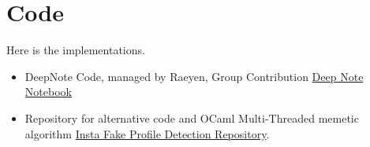 \documentclass[conference]{IEEEtran}
\begin{document}
%




\appendix

\section{Code}

Here is the implementations.

\begin{itemize}
	\item DeepNote Code, managed by Raeyen, Group Contribution \href{https://deepnote.com/workspace/yes-c049-5ed54f34-9a07-49d4-91a2-b1419cbace6e/project/Raeyen-Nuttalls-Untitled-project-15377316-ffd4-45cc-9912-cba9081d5b2e/notebook/Memetic%20Algorithm-412d34e5cc8042b893fdd10bccc6b6c3}{Deep Note Notebook}
	\item Repository for alternative code and OCaml Multi-Threaded memetic algorithm \href{https://github.com/UTS-Projects-2021-2025/insta-fake-profile-detection}{Insta Fake Profile Detection Repository}.
\end{itemize}
\end{document}
